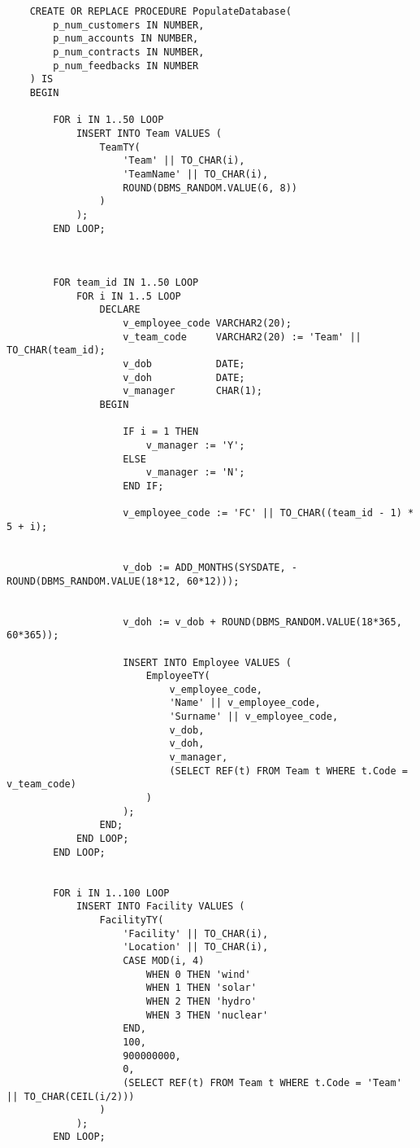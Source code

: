 \begin{lstlisting}
    CREATE OR REPLACE PROCEDURE PopulateDatabase(
        p_num_customers IN NUMBER,
        p_num_accounts IN NUMBER,
        p_num_contracts IN NUMBER,
        p_num_feedbacks IN NUMBER
    ) IS
    BEGIN
    
        FOR i IN 1..50 LOOP
            INSERT INTO Team VALUES (
                TeamTY(
                    'Team' || TO_CHAR(i),
                    'TeamName' || TO_CHAR(i),
                    ROUND(DBMS_RANDOM.VALUE(6, 8))
                )
            );
        END LOOP;
    
    
    
        FOR team_id IN 1..50 LOOP
            FOR i IN 1..5 LOOP
                DECLARE
                    v_employee_code VARCHAR2(20);
                    v_team_code     VARCHAR2(20) := 'Team' || TO_CHAR(team_id);
                    v_dob           DATE;
                    v_doh           DATE;
                    v_manager       CHAR(1);
                BEGIN
    
                    IF i = 1 THEN
                        v_manager := 'Y';
                    ELSE
                        v_manager := 'N';
                    END IF;
    
                    v_employee_code := 'FC' || TO_CHAR((team_id - 1) * 5 + i);
                    
    
                    v_dob := ADD_MONTHS(SYSDATE, -ROUND(DBMS_RANDOM.VALUE(18*12, 60*12)));
                    
    
                    v_doh := v_dob + ROUND(DBMS_RANDOM.VALUE(18*365, 60*365));
    
                    INSERT INTO Employee VALUES (
                        EmployeeTY(
                            v_employee_code,
                            'Name' || v_employee_code,
                            'Surname' || v_employee_code,
                            v_dob,
                            v_doh,
                            v_manager,
                            (SELECT REF(t) FROM Team t WHERE t.Code = v_team_code)
                        )
                    );
                END;
            END LOOP;  
        END LOOP;
    
    
        FOR i IN 1..100 LOOP
            INSERT INTO Facility VALUES (
                FacilityTY(
                    'Facility' || TO_CHAR(i),
                    'Location' || TO_CHAR(i),
                    CASE MOD(i, 4)
                        WHEN 0 THEN 'wind'
                        WHEN 1 THEN 'solar'
                        WHEN 2 THEN 'hydro'
                        WHEN 3 THEN 'nuclear'
                    END,
                    100,
                    900000000,
                    0,
                    (SELECT REF(t) FROM Team t WHERE t.Code = 'Team' || TO_CHAR(CEIL(i/2)))
                )
            );
        END LOOP;
    

\end{lstlisting}

